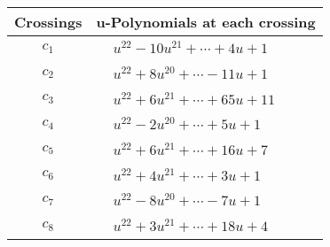 \documentclass[1p]{elsarticle_modified}
\theoremstyle{definition}
\begin{document}
\begin{tabular}{m{50pt}|m{274pt}}
Crossings & \hspace{64pt}u-Polynomials at each crossing \\
\hline $$\begin{aligned}c_{1}\end{aligned}$$&$\begin{aligned}
&u^{22}-10 u^{21}+\cdots+4 u+1
\end{aligned}$\\
\hline $$\begin{aligned}c_{2}\end{aligned}$$&$\begin{aligned}
&u^{22}+8 u^{20}+\cdots-11 u+1
\end{aligned}$\\
\hline $$\begin{aligned}c_{3}\end{aligned}$$&$\begin{aligned}
&u^{22}+6 u^{21}+\cdots+65 u+11
\end{aligned}$\\
\hline $$\begin{aligned}c_{4}\end{aligned}$$&$\begin{aligned}
&u^{22}-2 u^{20}+\cdots+5 u+1
\end{aligned}$\\
\hline $$\begin{aligned}c_{5}\end{aligned}$$&$\begin{aligned}
&u^{22}+6 u^{21}+\cdots+16 u+7
\end{aligned}$\\
\hline $$\begin{aligned}c_{6}\end{aligned}$$&$\begin{aligned}
&u^{22}+4 u^{21}+\cdots+3 u+1
\end{aligned}$\\
\hline $$\begin{aligned}c_{7}\end{aligned}$$&$\begin{aligned}
&u^{22}-8 u^{20}+\cdots-7 u+1
\end{aligned}$\\
\hline $$\begin{aligned}c_{8}\end{aligned}$$&$\begin{aligned}
&u^{22}+3 u^{21}+\cdots+18 u+4
\end{aligned}$\\

\end{tabular}
\end{document}
